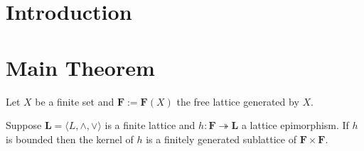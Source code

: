 \author[N.~Ru\v{s}kuc]{Nik Ru\v{s}kuc}


\date{\today}



\maketitle

\section{Introduction}


\section{Main Theorem}

Let $X$ be a finite set and $\mathbf F := \mathbf F(X)$ the free lattice generated by $X$.

\begin{theorem}
\label{thm:forward}
Suppose $\mathbf L = \langle L, \wedge, \vee\rangle$ is a finite lattice and 
$h\colon \mathbf{F} \twoheadrightarrow \mathbf{L}$ a lattice epimorphism.
If $h$ is bounded then the kernel of $h$ is a finitely generated sublattice 
of $\mathbf F \times \mathbf F$.
\end{theorem}

